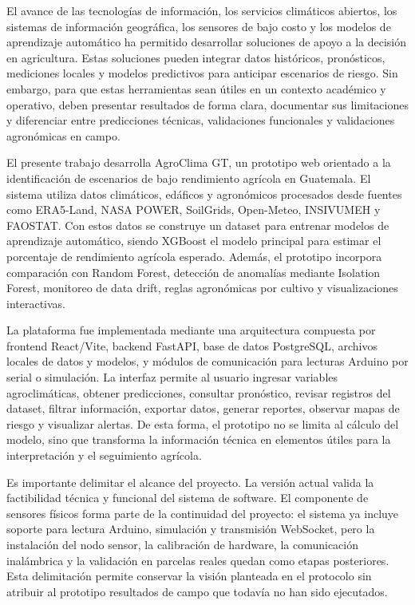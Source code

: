 \documentclass[12pt,letterpaper,oneside]{report}
\begin{document}
El avance de las tecnologías de información, los servicios climáticos abiertos, los sistemas de información geográfica, los sensores de bajo costo y los modelos de aprendizaje automático ha permitido desarrollar soluciones de apoyo a la decisión en agricultura. Estas soluciones pueden integrar datos históricos, pronósticos, mediciones locales y modelos predictivos para anticipar escenarios de riesgo. Sin embargo, para que estas herramientas sean útiles en un contexto académico y operativo, deben presentar resultados de forma clara, documentar sus limitaciones y diferenciar entre predicciones técnicas, validaciones funcionales y validaciones agronómicas en campo.

El presente trabajo desarrolla AgroClima GT, un prototipo web orientado a la identificación de escenarios de bajo rendimiento agrícola en Guatemala. El sistema utiliza datos climáticos, edáficos y agronómicos procesados desde fuentes como ERA5-Land, NASA POWER, SoilGrids, Open-Meteo, INSIVUMEH y FAOSTAT. Con estos datos se construye un dataset para entrenar modelos de aprendizaje automático, siendo XGBoost el modelo principal para estimar el porcentaje de rendimiento agrícola esperado. Además, el prototipo incorpora comparación con Random Forest, detección de anomalías mediante Isolation Forest, monitoreo de data drift, reglas agronómicas por cultivo y visualizaciones interactivas.

La plataforma fue implementada mediante una arquitectura compuesta por frontend React/Vite, backend FastAPI, base de datos PostgreSQL, archivos locales de datos y modelos, y módulos de comunicación para lecturas Arduino por serial o simulación. La interfaz permite al usuario ingresar variables agroclimáticas, obtener predicciones, consultar pronóstico, revisar registros del dataset, filtrar información, exportar datos, generar reportes, observar mapas de riesgo y visualizar alertas. De esta forma, el prototipo no se limita al cálculo del modelo, sino que transforma la información técnica en elementos útiles para la interpretación y el seguimiento agrícola.

Es importante delimitar el alcance del proyecto. La versión actual valida la factibilidad técnica y funcional del sistema de software. El componente de sensores físicos forma parte de la continuidad del proyecto: el sistema ya incluye soporte para lectura Arduino, simulación y transmisión WebSocket, pero la instalación del nodo sensor, la calibración de hardware, la comunicación inalámbrica y la validación en parcelas reales quedan como etapas posteriores. Esta delimitación permite conservar la visión planteada en el protocolo sin atribuir al prototipo resultados de campo que todavía no han sido ejecutados.
\end{document}
